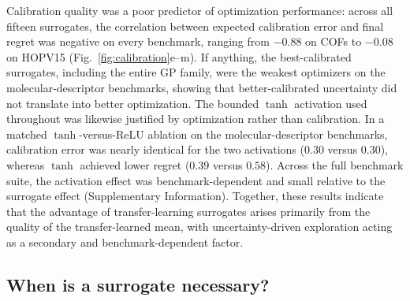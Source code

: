 \documentclass[11pt,a4paper]{article}%
\begin{document}
Calibration quality was a poor predictor of optimization performance: across all fifteen surrogates, the correlation between expected calibration error and final regret was negative on every benchmark, ranging from $-0.88$ on COFs to $-0.08$ on HOPV15 (Fig.~\ref{fig:calibration}e--m). If anything, the best-calibrated surrogates, including the entire GP family, were the weakest optimizers on the molecular-descriptor benchmarks, showing that better-calibrated uncertainty did not translate into better optimization.
The bounded $\tanh$ activation used throughout was likewise justified by
optimization rather than calibration. In a
matched $\tanh$-versus-ReLU ablation on the molecular-descriptor benchmarks, calibration error was nearly identical for the two activations ($0.30$
versus
$0.30$), whereas  $\tanh$ achieved lower regret ($0.39$ versus $0.58$). Across the full benchmark suite,
the activation effect was benchmark-dependent and small relative to the surrogate effect
(Supplementary Information). Together, these results indicate that the advantage of transfer-learning surrogates arises primarily from the quality of the transfer-learned mean, with uncertainty-driven
exploration acting as a secondary and benchmark-dependent factor. 

\subsection{When is a surrogate necessary?}\label{sec:res-topk}
\end{document}

